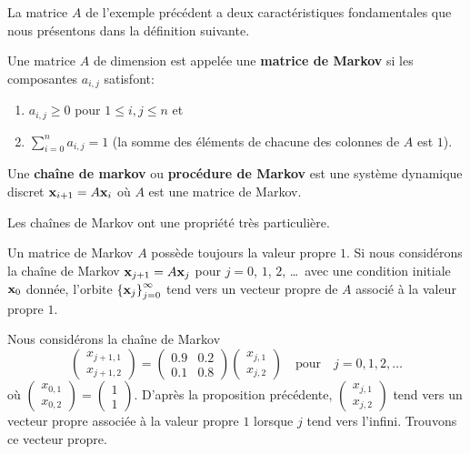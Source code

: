 {La matrice $A$ de l'exemple précédent a deux caractéristiques
fondamentales que nous présentons dans la définition suivante. 

\begin{focus}{\dfn}
Une matrice $A$ de dimension \nn est appelée une
{\bfseries matrice de Markov} si les
composantes $a_{i,j}$ satisfont:
\begin{enumerate}
\item $a_{i,j} \geq 0$ pour $1 \leq i, j \leq n$ et
\item $\displaystyle \sum_{i=0}^n a_{i,j} = 1$ (la somme des éléments
de chacune des colonnes de $A$ est $1$).
\end{enumerate}
Une {\bfseries chaîne de markov}
ou {\bfseries procédure de Markov} est une
système dynamique discret $\mathbf{x}_{i+1} = A \mathbf{x}_i$ où $A$ est une
matrice de Markov.
\end{focus}

Les chaînes de Markov ont une propriété très particulière.

\begin{focus}{\prp} \label{alglinMarkoV}
Un matrice de Markov $A$ possède toujours la valeur propre $1$.  Si nous
considérons la chaîne de Markov $\mathbf{x}_{j+1} = A \mathbf{x}_j$ pour 
$j=0$, $1$, $2$, \ldots\ avec une condition initiale $\mathbf{x}_0$
donnée, l'orbite
$\displaystyle \left\{ \mathbf{x}_j \right\}_{j=0}^\infty$ tend
vers un vecteur propre de $A$ associé à la valeur propre $1$.
\end{focus}

\begin{egg}
Nous considérons la chaîne de Markov
\[
\begin{pmatrix} x_{j+1,1} \\ x_{j+1,2} \end{pmatrix} =
\begin{pmatrix} 0.9 & 0.2 \\ 0.1 & 0.8 \end{pmatrix}
\begin{pmatrix} x_{j,1} \\ x_{j,2} \end{pmatrix} \quad
\text{pour} \quad j=0,1,2,\ldots
\]
où $\displaystyle \begin{pmatrix} x_{0,1} \\ x_{0,2} \end{pmatrix} =
\begin{pmatrix} 1 \\ 1 \end{pmatrix}$.  D'après la proposition
précédente,
$\displaystyle \begin{pmatrix} x_{j,1} \\ x_{j,2} \end{pmatrix}$ tend vers un
vecteur propre associée à la valeur propre $1$ lorsque $j$ tend vers
l'infini.  Trouvons ce vecteur propre.


\end{egg}}
